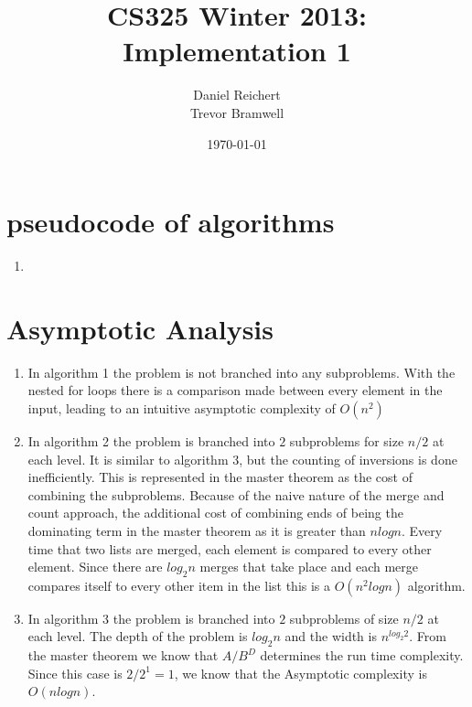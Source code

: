 \documentclass[12pt]{article}
\title{CS325 Winter 2013: Implementation 1}
\author{
    Daniel Reichert \\
    Trevor Bramwell
}
\date{\today}
\begin{document}
\maketitle

\section*{pseudocode of algorithms}
    \begin{enumerate}

    \item 

    \end{enumerate}

\section*{Asymptotic Analysis}
    \begin{enumerate}

    \item In algorithm 1 the problem is not branched into any subproblems.
          With the nested for loops there is a comparison made between
          every element in the input, leading to an intuitive asymptotic
          complexity of $O(n^2)$

	\item In algorithm 2 the problem is branched into $2$ subproblems
          for size $n/2$ at each level.  It is similar to algorithm 3, but the
		  counting of inversions is done inefficiently.  This is represented in
		  the master theorem as the cost of combining the subproblems.  Because of the
		  naive nature of the merge and count approach, the additional cost of combining
		  ends of being the dominating term in the master theorem as it is greater than
		  $n log n$.  Every time that two lists are merged, each element is compared to
		  every other element.  Since there are $log_2 n$ merges that take place and
		  each merge compares itself to every other item in the list this is a $O(n^2 log n)$ algorithm.

    \item In algorithm 3 the problem is branched into $2$ subproblems of size
          $n/2$ at each level.  The depth of the problem is $log_2 n$
          and the width is $n^{log_2 2}$.  From the master theorem we know
          that $A/B^D$ determines the run time complexity.  Since this
          case is $2/2^1 = 1$, we know that the Asymptotic complexity is
          $O(n log n)$.

    \end{enumerate}
\end{document}
